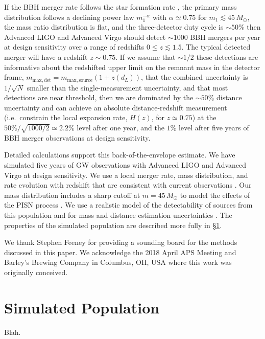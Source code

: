 \documentclass[modern]{aastex62}
\newcommand{\MSourceMax}{45 \, M_\odot}
\begin{document}
If the \ac{BBH} merger rate follows the star formation rate
\citep{Fishbach2018,O1O2Population}, the primary mass distribution follows a
declining power law $m_1^{-\alpha}$ with $\alpha \simeq 0.75$ for $m_1 \lesssim
\MSourceMax{}$, the mass ratio distribution is flat, and the three-detector duty
cycle is $\sim 50\%$ then Advanced LIGO and Advanced Virgo should detect $\sim
1000$ \ac{BBH} mergers per year at design sensitivity over a range of redshifts
$0 \leq z \lesssim 1.5$.  The typical detected merger will have a redshift $z
\sim 0.75$.  If we assume that $\sim 1/2$ these detections are informative about
the redshifted upper limit on the remnant mass in the detector frame,
$m_\mathrm{max,det} = m_\mathrm{max,source} \left(1 + z\left( d_L \right)
\right)$, that the combined uncertainty is $1/\sqrt{N}$ smaller than the
single-measurement uncertainty, and that most detections are near threshold,
then we are dominated by the $\sim 50\%$ distance uncertainty and can achieve an
absolute distance-redshift measurement (i.e.\ constrain the local expansion
rate, $H(z)$, for $z \simeq 0.75$) at the $50 \% / \sqrt{1000/2} \simeq 2.2 \%$
level after one year, and the $1 \%$ level after five years of \ac{BBH} merger
observations at design sensitivity.

Detailed calculations support this back-of-the-envelope estimate.  We have
simulated five years of \ac{GW} observations with Advanced LIGO and Advanced
Virgo at design sensitivity.  We use a local merger rate, mass distribution, and
rate evolution with redshift that are consistent with current observations
\citep{Fishbach2017,Fishbach2018,O1O2Population}.  Our mass distribution
includes a sharp cutoff at $m = \MSourceMax{}$ to model the effects of the
\ac{PISN} process \citep{Belczynski2016}.  We use a realistic model of the
detectability of sources from this population
\citep{GW150914Rate,GW150914RateSupplement} and for mass and distance estimation
uncertainties \citep{Vitale2017}.  The properties of the simulated population
are described more fully in \S \ref{sec:simulated-population}.

\acknowledgments

We thank Stephen Feeney for providing a sounding board for the methods discussed
in this paper.  We acknowledge the 2018 April APS Meeting and Barley's Brewing
Company in Columbus, OH, USA where this work was originally conceived.



\appendix

\section{Simulated Population}
\label{sec:simulated-population}

Blah.
\end{document}
